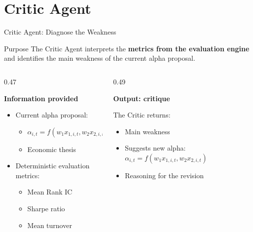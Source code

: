 \documentclass[10pt,aspectratio=169]{beamer}
\begin{document}
\section{Critic Agent}
\begin{frame}{Critic Agent: Diagnose the Weakness}

\small

\begin{block}{Purpose}
The Critic Agent interprets the \textbf{metrics from the evaluation engine}
and identifies the main weakness of the current alpha proposal.
\end{block}

\vspace{0.15cm}

\begin{columns}[T,onlytextwidth]

\begin{column}{0.47\textwidth}

\textbf{Information provided}

\begin{itemize}
    \item Current alpha proposal: 

    \begin{itemize}
   	\item $\alpha_{i,t} = f\!\left( w_1x_{1,i,t}, w_2x_{2,i,t} \right)$
        \item Economic thesis
    \end{itemize}

    \item Deterministic evaluation metrics:
    \begin{itemize}
        \item Mean Rank IC
        \item Sharpe ratio
        \item Mean turnover
    \end{itemize}
\end{itemize}

\end{column}

\begin{column}{0.49\textwidth}

\textbf{Output: critique}

The Critic returns:

\begin{itemize}
    \item Main weakness
    \item Suggests new alpha: $\alpha_{i,t} = f\!\left( w_1x_{1,i,t}, w_2x_{2,i,t} \right)$
    \item Reasoning for the revision
\end{itemize}

\vspace{0.12cm}

\end{column}

\end{columns}


\end{frame}
\end{document}

